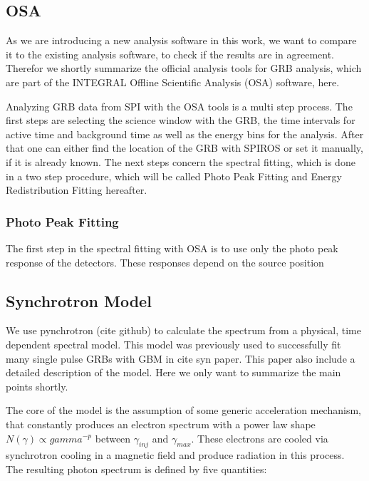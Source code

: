 \documentclass[twocolumn]{aa}
\begin{document}
\subsection{OSA}
\label{OSA}

As we are introducing a new analysis software in this work, we want to compare it to the existing analysis software, to check if the results are in agreement. Therefor we shortly summarize the official analysis tools for GRB analysis, which are part of the INTEGRAL Offline Scientific Analysis (OSA) software, here.

Analyzing GRB data from SPI with the OSA tools is a multi step process. The first steps are selecting the science window with the GRB, the time intervals for active time and background time as well as the energy bins for the analysis. After that one can either find the location of the GRB with SPIROS or set it manually, if it is already known. The next steps concern the spectral fitting, which is done in a two step procedure, which will be called Photo Peak Fitting and Energy Redistribution Fitting hereafter.

\subsubsection*{Photo Peak Fitting}

The first step in the spectral fitting with OSA is to use only the photo peak response of the detectors. These responses depend on the source position

\subsection{Synchrotron Model}

We use pynchrotron (cite github) to calculate the spectrum from a physical, time dependent spectral model. This model was previously used to successfully fit many single pulse GRBs with GBM in cite syn paper. This paper also include a detailed description of the model. Here we only want to summarize the main points shortly.

The core of the model is the assumption of some generic acceleration mechanism, that constantly produces an electron spectrum with a power law shape $N(\gamma )\propto gamma^{-p}$ between $\gamma_{inj}$ and $\gamma_{max}$. These electrons are cooled via synchrotron cooling in a magnetic field and produce radiation in this process. The resulting photon spectrum is defined by five quantities:
\end{document}
